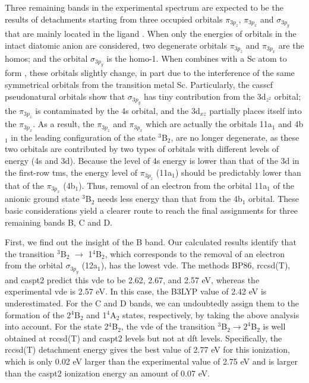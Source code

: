 \begin{refsection}
Three remaining bands in the experimental spectrum are expected to be the results of detachments starting from three occupied orbitals $\pi_{3p_z}$, $\pi_{3p_x}$ and $\sigma_{3p_y}$ that are mainly located in the ligand . When only the energies of orbitals in the intact diatomic anion  are considered, two degenerate orbitals $\pi_{3p_z}$ and $\pi_{3p_x}$ are the \acrshort{homo}s; and the orbital $\sigma_{3p_y}$ is the \acrshort{homo}-1.\cite{c3:47, c3:48, c3:49} When  combines with a Sc atom to form , these orbitals slightly change, in part due to the interference of the same symmetrical orbitals from the transition metal Sc. Particularly, the \acrshort{casscf} pseudonatural orbitals show that $\sigma_{3p_y}$ has tiny contribution from the 3d$_{z^2}$ orbital; the $\pi_{3p_z}$ is contaminated by the 4s orbital, and the 3d$_{xz}$ partially places itself into the $\pi_{3p_x}$. As a result, the $\pi_{3p_z}$ and $\pi_{3p_x}$ which are actually the orbitals 11a$_1$ and 4b$_1$ in the leading configuration of the state $^3$B$_2$, are no longer degenerate, as these two orbitals are contributed by two types of orbitals with different levels of energy (4s and 3d). Because the level of 4s energy is lower than that of the 3d in the first-row \acrshort{tm}s, the energy level of $\pi_{3p_z}$ (11a$_1$) should be predictably lower than that of the $\pi_{3p_x}$ (4b$_1$). Thus, removal of an electron from the orbital 11a$_1$ of the anionic ground state $^3$B$_2$ needs less energy than that from the 4b$_1$ orbital. These basic considerations yield a clearer route to reach the final assignments for three remaining bands B, C and D. 



First, we find out the insight of the B band. Our calculated results identify that the transition $^3$B$_2$ $\longrightarrow$ 1$^4$B$_2$, which corresponds to the removal of an electron from the orbital $\sigma_{3p_y}$ (12a$_1$), has the lowest \acrshort{vde}. The methods BP86, \acrshort{rccsd}(T), and \acrshort{caspt2} predict this \acrshort{vde} to be 2.62, 2.67, and 2.57 eV, whereas the experimental \acrshort{vde} is 2.57 eV. In this case, the B3LYP value of 2.42 eV is underestimated. For the C and D bands, we can undoubtedly assign them to the formation of the 2$^4$B$_2$ and 1$^4$A$_2$ states, respectively, by taking the above analysis into account. For the state 2$^4$B$_2$, the \acrshort{vde} of the transition $^3$B$_2 \longrightarrow 2^4$B$_2$ is well obtained at \acrshort{rccsd}(T) and \acrshort{caspt2} levels but not at \acrshort{dft}  levels. Specifically, the \acrshort{rccsd}(T) detachment energy gives the best value of 2.77 eV for this ionization, which is only 0.02 eV larger than the experimental value of 2.75 eV and is larger than the \acrshort{caspt2} ionization energy an amount of 0.07 eV. 





\end{refsection}
